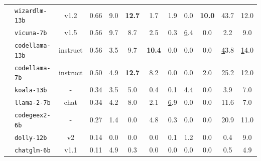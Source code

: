 \begin{table}[t]
{\begin{tabular}{@{}clcccccccccc@{}}
                                                                        & \texttt{wizardlm-13b}     & v1.2                 & 0.66                & 9.0           & \textbf{12.7} & 1.7           & 1.9           & 0.0           & \textbf{10.0} & 43.7            & 12.0           \\
                                                                        & \texttt{vicuna-7b}        & v1.5                 & 0.56                & 9.7           & 8.7           & 2.5           & 0.3           & {\ul 6.4}     & 0.0           & 2.2             & 9.0            \\
                                                                        & \texttt{codellama-13b}    & instruct             & 0.56                & 3.5           & 9.7           & \textbf{10.4} & 0.0           & 0.0           & 0.0           & {\ul 43.8}      & {\ul 14.0}     \\
                                                                        & \texttt{codellama-7b}     & instruct             & 0.50                & 4.9           & \textbf{12.7} & 8.2           & 0.0           & 0.0           & 2.0           & 25.2            & 12.0           \\
                                                                        & \texttt{koala-13b}        & -                    & 0.34                & 3.5           & 5.0           & 0.4           & 0.1           & 4.4           & 0.0           & 3.9             & 7.0            \\
                                                                        & \texttt{llama-2-7b}       & chat                 & 0.34                & 4.2           & 8.0           & 2.1           & {\ul 6.9}     & 0.0           & 0.0           & 11.6            & 7.0            \\
                                                                        & \texttt{codegeex2-6b}     & -                    & 0.27                & 1.4           & 0.0           & 4.8           & 0.3           & 0.0           & 0.0           & 20.9            & 11.0           \\
                                                                        & \texttt{dolly-12b}        & v2                   & 0.14                & 0.0           & 0.0           & 0.0           & 0.1           & 1.2           & 0.0           & 0.4             & 9.0            \\
                                                                        & \texttt{chatglm-6b}       & v1.1                 & 0.11                & 4.9           & 0.3           & 0.0           & 0.0           & 0.0           & 0.0           & 0.5             & 4.9            \\

\end{tabular}}
\end{table}
